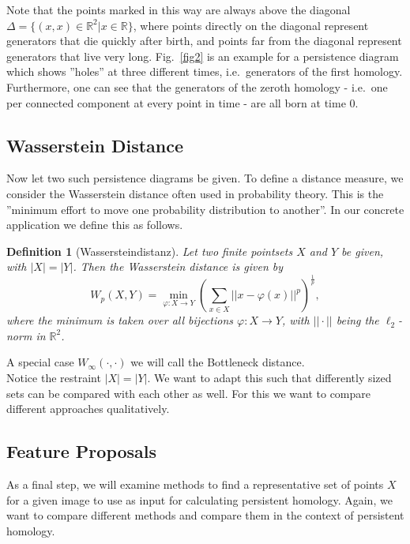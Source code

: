 \documentclass[11pt, a4paper, UKenglish]{article}
\newtheorem{definition}{Definition}
\newcommand{\bR}{\mathbb{R}}
\begin{document}
	Note that the points marked in this way are always above the diagonal $\Delta=\{(x,x)\in\bR^2|x\in\bR\}$, where points directly on the diagonal represent generators that die quickly after birth, and points far from the diagonal represent generators that live very long.
    Fig.~\ref{fig2} is an example for a persistence diagram which shows ''holes'' at three different times, i.e.\ generators of the first homology.
    Furthermore, one can see that the generators of the zeroth homology - i.e.\ one per connected component at every point in time - are all born at time 0.\\
    \subsection{Wasserstein Distance}\label{subsec:wasserstein-distance}

    Now let two such persistence diagrams be given.
    To define a distance measure, we consider the Wasserstein distance often used in probability theory.
    This is the ''minimum effort to move one probability distribution to another''.
    In our concrete application we define this as follows.

    \begin{definition}[Wassersteindistanz]
        Let two finite pointsets $X$ and $Y$ be given, with $|X|=|Y|$.
        Then the Wasserstein distance is given by\[W_p(X,Y) = \min_{\varphi:X\rightarrow Y}\left(\sum_{x\in X}||x-\varphi(x)||^p\right)^{\frac{1}{p}},\]
        where the minimum is taken over all bijections $\varphi:X\rightarrow Y$, with $||\cdot||$ being the $\ell_2$-norm in $\bR^2$.
    \end{definition}

    A special case $W_\infty(\cdot,\cdot)$ we will call the Bottleneck distance.\\
    Notice the restraint $|X| = |Y|$.
    We want to adapt this such that differently sized sets can be compared with each other as well.
    For this we want to compare different approaches qualitatively.

    \subsection{Feature Proposals}\label{subsec:feature-proposals}

    As a final step, we will examine methods to find a representative set of points $X$ for a given image to use as input for calculating persistent homology.
    Again, we want to compare different methods and compare them in the context of persistent homology.
\end{document}
